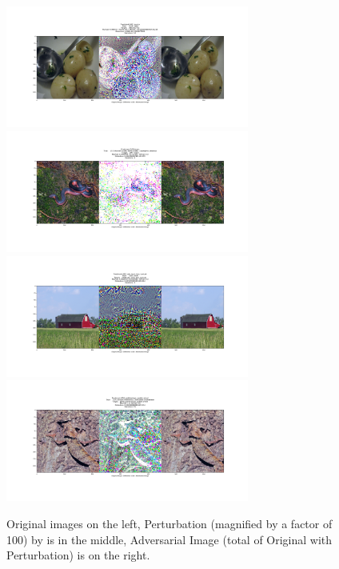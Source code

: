 \begin{figure}[ht]

\includegraphics[trim=200 185 100 200, clip, width=8cm]{c1_figures/vgg16-ILSVRC2012_val_00039098-O722-A965-attack_summary.png}\includegraphics[trim=200 185 100 200, clip, width=8cm]{c1_figures/vgg16-ILSVRC2012_val_00027142-O52-A347-attack_summary.png}
\includegraphics[trim=200 185 100 200, clip, width=8cm]{c1_figures/vgg16-ILSVRC2012_val_00029901-O425-A468-attack_summary.png}\includegraphics[trim=200 185 100 200, clip, width=8cm]{c1_figures/ILSVRC2012_val_00001375-Otensor([42])-A694-attack_summary.png}
\caption{Original images on the left, Perturbation (magnified by a factor of 100) by is in the middle, Adversarial Image (total of Original with Perturbation) is on the right. }
\label{lbfgsis}
\end{figure}

